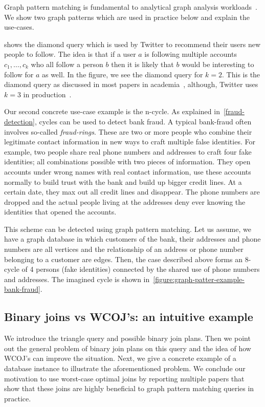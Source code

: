 Graph pattern matching is fundamental to analytical graph analysis workloads~\cite{see longbin and semih and presentation}.
We show two graph patterns which are used in practice below and explain the use-cases.

 shows the diamond query which is used by Twitter to recommend their users new people to follow.
The idea is that if a user $a$ is following multiple accounts $c_1, \dots, c_k$ who all follow a person $b$ then it is likely that
$b$ would be interesting to follow for $a$ as well.
In the figure, we see the diamond query for $k = 2$.
This is the diamond query as discussed in most papers in academia~\cite{oldog,myria-detailed,mhedhbi2019}, although,
Twitter uses $k = 3$ in production~\cite{twitter-diamond}.

Our second concrete use-case example is the n-cycle.
As explained in~\cref{fraud-detection}, cycles can be used to detect bank fraud.
A typical bank-fraud often involves so-called \textit{fraud-rings}.
These are two or more people who combine their legitimate contact information in new ways to craft multiple false identities.
For example, two people share real phone numbers and addresses to craft four fake identities; all combinations possible with two pieces
of information.
They open accounts under wrong names with real contact information, use these accounts normally to build trust with the bank and
build up bigger credit lines.
At a certain date, they max out all credit lines and disappear.
The phone numbers are dropped and the actual people living at the addresses deny ever knowing the identities that opened the accounts.

This scheme can be detected using graph pattern matching.
Let us assume, we have a graph database in which customers of the bank, their addresses and phone numbers are all vertices and the
relationship of an address or phone number belonging to a customer are edges.
Then, the case described above forms an 8-cycle of 4 persons (fake identities) connected by the shared use of phone numbers and
addresses.
The imagined cycle is shown in~\cref{figure:graph-patter-example-bank-fraud}.

\subsection{Binary joins vs \textsc{WCOJ}'s: an intuitive example} \label{subsec:intuitive-example}
We introduce the triangle query and possible binary join plans.
Then we point out the general problem of binary join plans on this query and the idea of how \textsc{WCOJ}'s can improve the situation.
Next, we give a concrete example of a database instance to illustrate the aforementioned problem.
We conclude our motivation to use worst-case optimal joins by reporting multiple papers that show that these joins are highly beneficial
to graph pattern matching queries in practice.

